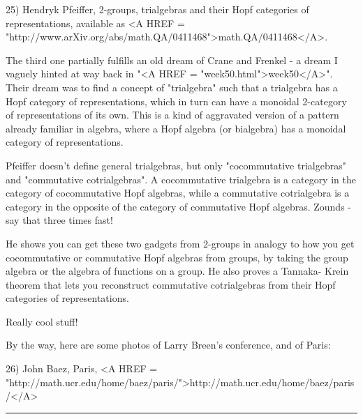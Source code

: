 25) Hendryk Pfeiffer, 2-groups, trialgebras and their Hopf
categories of representations, available as <A HREF = "http://www.arXiv.org/abs/math.QA/0411468">math.QA/0411468</A>.

The third one partially fulfills an old dream of Crane and Frenkel - a
dream I vaguely hinted at way back in "<A HREF =
"week50.html">week50</A>".  Their dream was to find a concept of
"trialgebra" such that a trialgebra has a Hopf category of
representations, which in turn can have a monoidal 2-category of
representations of its own.  This is a kind of aggravated version of a
pattern already familiar in algebra, where a Hopf algebra (or
bialgebra) has a monoidal category of representations.

Pfeiffer doesn't define general trialgebras, but only
"cocommutative trialgebras" and "commutative
cotrialgebras".  A cocommutative trialgebra is a category in the
category of cocommutative Hopf algebras, while a commutative
cotrialgebra is a category in the opposite of the category of
commutative Hopf algebras.  Zounds - say that three times fast!

He shows you can get these two gadgets from 2-groups in analogy to how you get 
cocommutative or commutative Hopf algebras from groups, by taking the group 
algebra or the algebra of functions on a group.   He also proves a Tannaka-
Krein theorem that lets you reconstruct commutative cotrialgebras from their
Hopf categories of representations. 

Really cool stuff!

By the way, here are some photos of Larry Breen's conference,
and of Paris:

26) John Baez, Paris, <A HREF = "http://math.ucr.edu/home/baez/paris/">http://math.ucr.edu/home/baez/paris/</A>


\par\noindent\rule{\textwidth}{0.4pt}


